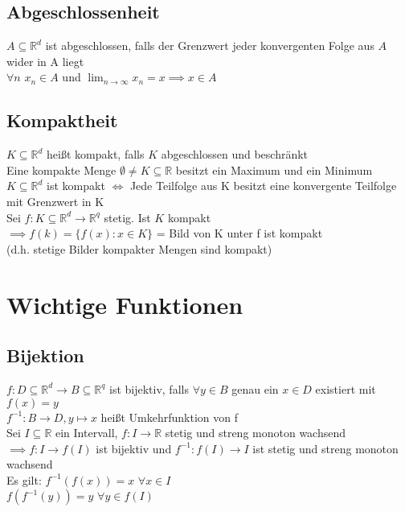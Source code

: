 \documentclass[a4paper,9pt]{extarticle}
\newcommand{\liminfty}[1][n]{\lim_{#1 \to \infty}}
\begin{document}
	\subsection*{Abgeschlossenheit}
	$A ⊆ \mathbb{R}^d$ ist abgeschlossen, falls der Grenzwert jeder konvergenten Folge aus $A$ wider in A liegt \\
	
	$\forall n$ $x_n \in A$ und $\liminfty {x_n = x} \implies x \in A$
	
	\subsection*{Kompaktheit}
	$K ⊆ \mathbb{R}^d$ heißt kompakt, falls $K$ abgeschlossen und beschränkt \\
	
	Eine kompakte Menge $∅ ≠ K ⊆ \mathbb{R}$ besitzt ein Maximum und ein Minimum \\
	
	$K ⊆ \mathbb{R}^d$ ist kompakt $\iff$ Jede Teilfolge aus K besitzt eine konvergente Teilfolge mit Grenzwert in K \\
	
	Sei $f:K⊆\mathbb{R}^d → \mathbb{R}^q$ stetig. Ist $K$ kompakt \\$\implies f(k) = \{f(x) : x \in K\}$ = Bild von K unter f ist kompakt \\(d.h. stetige Bilder kompakter Mengen sind kompakt)

\pagebreak	
\section*{Wichtige Funktionen}
	\subsection*{Bijektion}
	$f:D⊆\mathbb{R}^d → B ⊆ \mathbb{R}^q$ ist bijektiv, falls $\forall y \in B$ genau ein $x \in D$ existiert mit $f(x) = y$ \\
	
	$f^{-1} : B → D, y \mapsto x$ heißt Umkehrfunktion von f \\
	
	Sei $ I ⊆ \mathbb{R}$ ein Intervall, $f : I → \mathbb{R}$ stetig und streng monoton wachsend $\implies f : I → f(I)$ ist bijektiv und $f^{-1} : f(I) → I$ ist stetig und streng monoton wachsend \\
	Es gilt: $f^{-1} (f(x)) = x$ $\forall x \in I$ \\
	$f (f^{-1} (y)) = y$ $\forall y \in f(I)$ 
	
\end{document}
